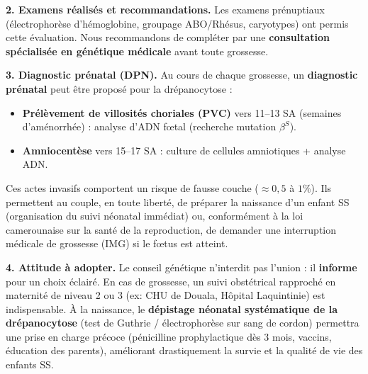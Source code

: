 \documentclass[11pt]{article}
\newcounter{popsec}
\newcounter{popsub}
\newcommand{\courssub}[1]{%
  \stepcounter{popsub}%
  \par\vspace{9pt}\noindent{\popxbold\fontsize{11.5}{13}\selectfont\color{popink}{\color{poporange}\thepopsec.\thepopsub}\hspace{6pt}#1}\par\nopagebreak\vspace{4pt}
}
\begin{document}
\begin{exoresolu}
\begin{aretenir}
\textbf{2. Examens réalisés et recommandations.}
Les examens prénuptiaux (électrophorèse d'hémoglobine, groupage ABO/Rhésus, caryotypes) ont permis cette évaluation. Nous recommandons de compléter par une \textbf{consultation spécialisée en génétique médicale} avant toute grossesse.

\textbf{3. Diagnostic prénatal (DPN).}
Au cours de chaque grossesse, un \textbf{diagnostic prénatal} peut être proposé pour la drépanocytose :
\begin{itemize}
\item \textbf{Prélèvement de villosités choriales (PVC)} vers 11--13 SA (semaines d'aménorrhée) : analyse d'ADN fœtal (recherche mutation $\beta^S$).
\item \textbf{Amniocentèse} vers 15--17 SA : culture de cellules amniotiques + analyse ADN.
\end{itemize}
Ces actes invasifs comportent un risque de fausse couche ($\approx 0,5$ à $1\%$). Ils permettent au couple, en toute liberté, de préparer la naissance d'un enfant SS (organisation du suivi néonatal immédiat) ou, conformément à la loi camerounaise sur la santé de la reproduction, de demander une interruption médicale de grossesse (IMG) si le fœtus est atteint.

\textbf{4. Attitude à adopter.}
Le conseil génétique n'interdit pas l'union : il \textbf{informe} pour un choix éclairé. En cas de grossesse, un suivi obstétrical rapproché en maternité de niveau 2 ou 3 (ex: CHU de Douala, Hôpital Laquintinie) est indispensable. À la naissance, le \textbf{dépistage néonatal systématique de la drépanocytose} (test de Guthrie / électrophorèse sur sang de cordon) permettra une prise en charge précoce (pénicilline prophylactique dès 3 mois, vaccins, éducation des parents), améliorant drastiquement la survie et la qualité de vie des enfants SS.
\end{aretenir}

\end{exoresolu}

\courssub{Bilan de l'activité}
\end{document}
